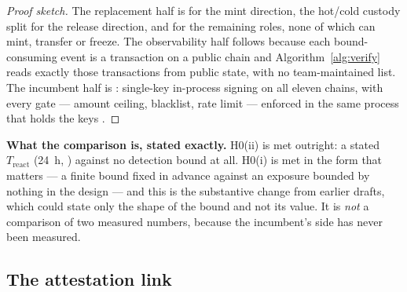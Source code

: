 \begin{proof}[Proof sketch]
The replacement half is  for the mint direction, the hot/cold custody split for
the release direction, and  for the remaining roles, none of which can mint,
transfer or freeze. The observability half follows because each bound-consuming event is a
transaction on a public chain and Algorithm~\ref{alg:verify} reads exactly those transactions from
public state, with no team-maintained list. The incumbent half is :
single-key in-process signing on all eleven chains, with every gate --- amount ceiling, blacklist,
rate limit --- enforced in the same process that holds the keys
 .
\end{proof}

\noindent\textbf{What the comparison is, stated exactly.} H0(ii) is met outright: a stated
$T_{\mathrm{react}}$ (\SI{24}{\hour}, ) against no detection bound at all. H0(i) is met in the form that matters --- a
finite bound fixed in advance against an exposure bounded by nothing in the design --- and this is
the substantive change from earlier drafts, which could state only the shape of the bound and not its
value. It is \emph{not} a comparison of two measured numbers, because the incumbent's side has never
been measured.

\subsection{The attestation link}
\label{sec:bridging-attestation}

